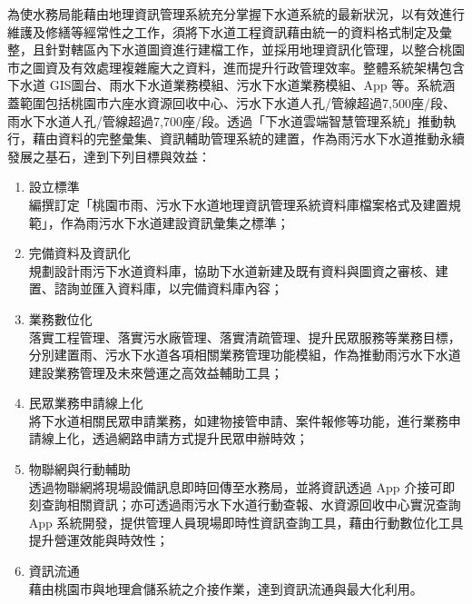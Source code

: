 \documentclass[a4paper,12pt]{article}
\begin{document}
\begin{enumerate}
\begin{enumerate}
為使水務局能藉由地理資訊管理系統充分掌握下水道系統的最新狀況，以有效進行維護及修繕等經常性之工作，須將下水道工程資訊藉由統一的資料格式制定及彙整，且針對轄區內下水道圖資進行建檔工作，並採用地理資訊化管理，以整合桃園市之圖資及有效處理複雜龐大之資料，進而提升行政管理效率。整體系統架構包含下水道 GIS圖台、雨水下水道業務模組、污水下水道業務模組、App 等。系統涵蓋範圍包括桃園市六座水資源回收中心、污水下水道人孔/管線超過7,500座/段、雨水下水道人孔/管線超過7,700座/段。透過「下水道雲端智慧管理系統」推動執行，藉由資料的完整彙集、資訊輔助管理系統的建置，作為雨污水下水道推動永續發展之基石，達到下列目標與效益：\\

\begin{enumerate}
\item 設立標準\\
編撰訂定「桃園市雨、污水下水道地理資訊管理系統資料庫檔案格式及建置規範」，作為雨污水下水道建設資訊彙集之標準；\\
\item 完備資料及資訊化\\
規劃設計雨污下水道資料庫，協助下水道新建及既有資料與圖資之審核、建置、諮詢並匯入資料庫，以完備資料庫內容；\\
\item 業務數位化\\
落實工程管理、落實污水廠管理、落實清疏管理、提升民眾服務等業務目標，分別建置雨、污水下水道各項相關業務管理功能模組，作為推動雨污水下水道建設業務管理及未來營運之高效益輔助工具；\\
\item 民眾業務申請線上化\\
將下水道相關民眾申請業務，如建物接管申請、案件報修等功能，進行業務申請線上化，透過網路申請方式提升民眾申辦時效；\\
\item 物聯網與行動輔助\\
透過物聯網將現場設備訊息即時回傳至水務局，並將資訊透過 App 介接可即刻查詢相關資訊；亦可透過雨污水下水道行動查報、水資源回收中心實況查詢 App 系統開發，提供管理人員現場即時性資訊查詢工具，藉由行動數位化工具提升營運效能與時效性；\\
\item 資訊流通\\
藉由桃園市與地理倉儲系統之介接作業，達到資訊流通與最大化利用。\\
\end{enumerate}


\end{enumerate}
\end{enumerate}
\end{document}
